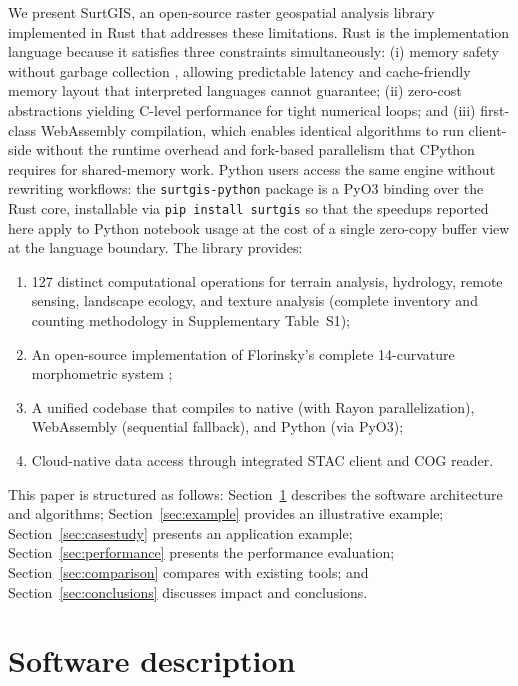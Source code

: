 \documentclass[preprint,review,12pt,authoryear]{elsarticle}
\begin{document}
We present SurtGIS, an open-source raster geospatial analysis library implemented in Rust that addresses these limitations. Rust is the implementation language because it satisfies three constraints simultaneously: (i) memory safety without garbage collection \citep{perkel2020rust}, allowing predictable latency and cache-friendly memory layout that interpreted languages cannot guarantee; (ii) zero-cost abstractions yielding C-level performance for tight numerical loops; and (iii) first-class WebAssembly compilation, which enables identical algorithms to run client-side without the runtime overhead and fork-based parallelism that CPython requires for shared-memory work. Python users access the same engine without rewriting workflows: the \texttt{surtgis-python} package is a PyO3 binding over the Rust core, installable via \texttt{pip install surtgis} so that the speedups reported here apply to Python notebook usage at the cost of a single zero-copy buffer view at the language boundary. The library provides:

\begin{enumerate}
    \item 127 distinct computational operations for terrain analysis, hydrology, remote sensing, landscape ecology, and texture analysis (complete inventory and counting methodology in Supplementary Table~S1);
    \item An open-source implementation of Florinsky's complete 14-curvature morphometric system \citep{florinsky2025};
    \item A unified codebase that compiles to native (with Rayon parallelization), WebAssembly (sequential fallback), and Python (via PyO3);
    \item Cloud-native data access through integrated STAC client and COG reader.
\end{enumerate}

This paper is structured as follows: Section~\ref{sec:software} describes the software architecture and algorithms; Section~\ref{sec:example} provides an illustrative example; Section~\ref{sec:casestudy} presents an application example; Section~\ref{sec:performance} presents the performance evaluation; Section~\ref{sec:comparison} compares with existing tools; and Section~\ref{sec:conclusions} discusses impact and conclusions.

\section{Software description}
\label{sec:software}
\end{document}
